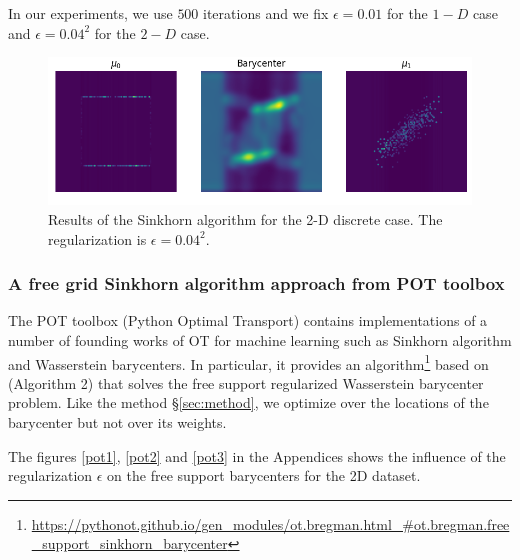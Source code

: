 In our experiments, we use $500$ iterations and we fix $\epsilon = 0.01$ for the $1-D$ case and $\epsilon = 0.04^2$ for the $2-D$ case. 

\begin{figure}
    \centering
    \includegraphics[width=\textwidth]{figures/sinkhorn_barycenter_2D_discrete.png}
    \caption{Results of the Sinkhorn algorithm for the 2-D discrete case. The regularization is $\epsilon = 0.04^2$.}
    \label{fig:sinkhorn_2D_discrete}
\end{figure}

\subsubsection{A free grid Sinkhorn algorithm approach from POT toolbox}
\label{sec:pot}

The POT toolbox (Python Optimal Transport) \cite{flamary_pot_2021} contains implementations of a number of founding works of OT for machine learning such as Sinkhorn algorithm and Wasserstein barycenters. In particular, it provides an algorithm\footnote{\url{https://pythonot.github.io/gen_modules/ot.bregman.html_\#ot.bregman.free_support_sinkhorn_barycenter}} based on \cite{cuturi_fast_2014} (Algorithm 2) that solves the free support regularized Wasserstein barycenter problem. Like the method \S\ref{sec:method}, we optimize over the locations of the barycenter but not over its weights. 

The figures \ref{pot1}, \ref{pot2} and \ref{pot3} in the Appendices shows the influence of the regularization $\epsilon$ on the free support barycenters for the 2D dataset.

